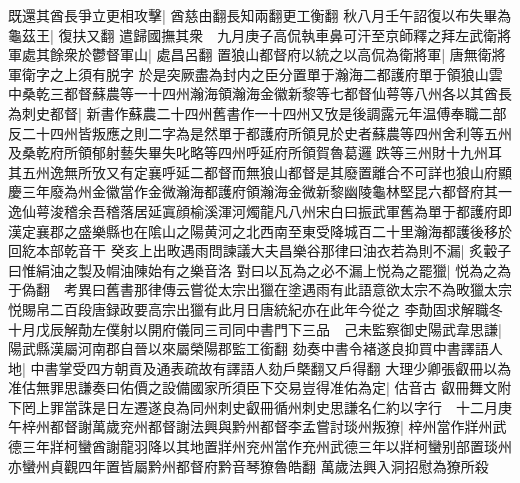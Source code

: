 既還其酋長爭立更相攻擊|{
	酋慈由翻長知兩翻更工衡翻}
秋八月壬午詔復以布失畢為龜茲王|{
	復扶又翻}
遣歸國撫其衆　九月庚子高侃執車鼻可汗至京師釋之拜左武衛將軍處其餘衆於鬱督軍山|{
	處昌呂翻}
置狼山都督府以統之以高侃為衛將軍|{
	唐無衛將軍衛字之上須有脱字}
於是突厥盡為封内之臣分置單于瀚海二都護府單于領狼山雲中桑乾三都督蘇農等一十四州瀚海領瀚海金徽新黎等七都督仙萼等八州各以其酋長為刺史都督|{
	新書作蘇農二十四州舊書作一十四州又攷是後調露元年温傅奉職二部反二十四州皆叛應之則二字為是然單于都護府所領見於史者蘇農等四州舍利等五州及桑乾府所領郁射藝失畢失叱略等四州呼延府所領賀魯葛邏跌等三州財十九州耳其五州逸無所攷又有定襄呼延二都督而無狼山都督是其廢置離合不可詳也狼山府顯慶三年廢為州金徽當作金微瀚海都護府領瀚海金微新黎幽陵龜林堅昆六都督府其一逸仙萼浚稽余吾稽落居延寘顔榆溪渾河燭龍凡八州宋白曰振武軍舊為單于都護府即漢定襄郡之盛樂縣也在隂山之陽黄河之北西南至東受降城百二十里瀚海都護後移於回紇本部乾音干}
癸亥上出畋遇雨問諫議大夫昌樂谷那律曰油衣若為則不漏|{
	炙轂子曰惟絹油之製及㡌油陳始有之樂音洛}
對曰以瓦為之必不漏上悦為之罷獵|{
	悦為之為于偽翻　考異曰舊書那律傳云嘗從太宗出獵在塗遇雨有此語意欲太宗不為畋獵太宗悦賜帛二百段唐録政要高宗出獵有此月日唐統紀亦在此年今從之}
李勣固求解職冬十月戊辰解勣左僕射以開府儀同三司同中書門下三品　己未監察御史陽武韋思謙|{
	陽武縣漢屬河南郡自晉以來屬榮陽郡監工銜翻}
劾奏中書令褚遂良抑買中書譯語人地|{
	中書掌受四方朝貢及通表疏故有譯語人劾戶槩翻又戶得翻}
大理少卿張叡冊以為准估無罪思謙奏曰佑價之設備國家所須臣下交易豈得准佑為定|{
	估音古}
叡冊舞文附下罔上罪當誅是日左遷遂良為同州刺史叡冊循州刺史思謙名仁約以字行　十二月庚午梓州都督謝萬歲兖州都督謝法興與黔州都督李孟嘗討琰州叛獠|{
	梓州當作牂州武德三年牂柯蠻酋謝龍羽降以其地置牂州兖州當作充州武德三年以牂柯蠻别部置琰州亦蠻州貞觀四年置皆屬黔州都督府黔音琴獠魯皓翻}
萬歲法興入洞招慰為獠所殺

